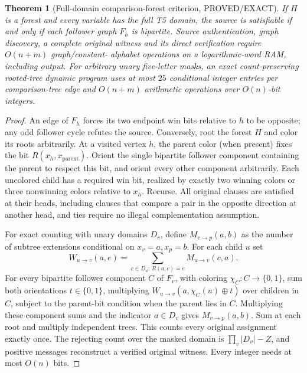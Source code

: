 \documentclass[11pt]{article}
\newtheorem{theorem}{Theorem}
\begin{document}
\begin{theorem}[Full-domain comparison-forest criterion, PROVED/EXACT]
If $H$ is a forest and every variable has the full T5 domain, the
source is satisfiable if and only if each follower graph $F_h$ is
bipartite. Source authentication, graph discovery, a complete original
witness and its direct verification require $O(n+m)$ graph/constant-
alphabet operations on a logarithmic-word RAM, including output.
For arbitrary unary five-letter masks, an exact count-preserving
rooted-tree dynamic program uses at most $25$ conditional integer
entries per comparison-tree edge and $O(n+m)$ arithmetic operations
over $O(n)$-bit integers.
\end{theorem}
\begin{proof}
An edge of $F_h$ forces its two endpoint win bits relative to $h$ to
be opposite; any odd follower cycle refutes the source. Conversely,
root the forest $H$ and color its roots arbitrarily. At a visited
vertex $h$, the parent color (when present) fixes the bit
$R(x_h,x_{\mathrm{parent}})$. Orient the single bipartite follower
component containing the parent to respect this bit, and orient every
other component arbitrarily. Each uncolored child has a required win
bit, realized by exactly two winning colors or three nonwinning
colors relative to $x_h$. Recurse. All original clauses are satisfied
at their heads, including clauses that compare a pair in the
opposite direction at another head, and ties require no illegal
complementation assumption.

For exact counting with unary domains $D_v$, define
$M_{v\to p}(a,b)$ as the number of subtree extensions conditional on
$x_v=a,x_p=b$. For each child $u$ set
\[
 W_{u\to v}(a,e)=\sum_{c\in D_u:\,R(a,c)=e}M_{u\to v}(c,a).
\]
For every bipartite follower component $C$ of $F_v$, with coloring
$\chi_C:C\to\{0,1\}$, sum both orientations $t\in\{0,1\}$,
multiplying $W_{u\to v}(a,\chi_C(u)\oplus t)$ over children in $C$,
subject to the parent-bit condition when the parent lies in $C$.
Multiplying these component sums and the indicator $a\in D_v$
gives $M_{v\to p}(a,b)$. Sum at each root and multiply independent
trees. This counts every original assignment exactly once.
The rejecting count over the masked domain is
$\prod_v|D_v|-Z$, and positive messages reconstruct a verified
original witness. Every integer needs at most $O(n)$ bits.
\end{proof}
\end{document}
